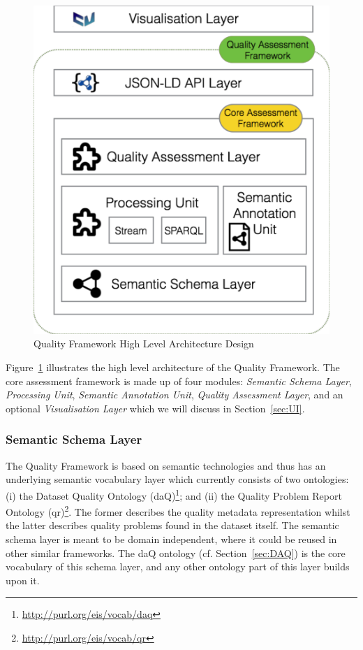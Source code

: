 \begin{figure}[tbph]
\center
\includegraphics[scale=0.3]{images/qualityFrameworkHLA.pdf} 
\caption{Quality Framework High Level Architecture Design} 
\label{fig:qualityFramework}
\end{figure}

Figure~\ref{fig:qualityFramework} illustrates the high level architecture of the Quality Framework.
The core assessment framework is made up of four modules: \emph{Semantic Schema Layer}, \emph{Processing Unit}, \emph{Semantic Annotation Unit}, \emph{Quality Assessment Layer}, and an optional \emph{Visualisation Layer} which we will discuss in Section~\ref{sec:UI}.

\subsubsection{Semantic Schema Layer}
The Quality Framework is based on semantic technologies and thus has an underlying semantic vocabulary layer which currently consists of two ontologies: (i) the Dataset Quality Ontology (daQ)\footnote{\url{http://purl.org/eis/vocab/daq}}; and (ii) the Quality Problem Report Ontology (qr)\footnote{\url{http://purl.org/eis/vocab/qr}}. 
The former describes the quality metadata representation whilst the latter describes quality problems found in the dataset itself. 
The semantic schema layer is meant to be domain independent, where it could be reused in other similar frameworks. 
The daQ ontology (cf. Section~\ref{sec:DAQ}) is the core vocabulary of this schema layer, and any other ontology part of this layer builds upon it.

